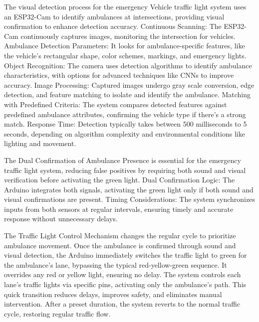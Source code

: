 \documentclass[conference]{IEEEtran}
\begin{document}
The visual detection process for the emergency Vehicle traffic light system uses an ESP32-Cam to identify ambulances at intersections, providing visual confirmation to enhance detection accuracy.
Continuous Scanning: The ESP32-Cam continuously captures images, monitoring the intersection for vehicles.
Ambulance Detection Parameters: It looks for ambulance-specific features, like the vehicle’s rectangular shape, color schemes, markings, and emergency lights.
Object Recognition: The camera uses detection algorithms to identify ambulance characteristics, with options for advanced techniques like CNNs to improve accuracy.
Image Processing: Captured images undergo gray scale conversion, edge detection, and feature matching to isolate and identify the ambulance.
Matching with Predefined Criteria: The system compares detected features against predefined ambulance attributes, confirming the vehicle type if there's a strong match.
Response Time: Detection typically takes between 500 milliseconds to 5 seconds, depending on algorithm complexity and environmental conditions like lighting and movement.


The Dual Confirmation of Ambulance Presence is essential for the emergency traffic light system, reducing false positives by requiring both sound and visual verification before activating the green light.
Dual Confirmation Logic: The Arduino integrates both signals, activating the green light only if both sound and visual confirmations are present.
Timing Considerations: The system synchronizes inputs from both sensors at regular intervals, ensuring timely and accurate response without unnecessary delays.

The Traffic Light Control Mechanism changes the regular cycle to prioritize ambulance movement. Once the ambulance is confirmed through sound and visual detection, the Arduino immediately switches the traffic light to green for the ambulance’s lane, bypassing the typical red-yellow-green sequence. It overrides any red or yellow light, ensuring no delay. The system controls each lane's traffic lights via specific pins, activating only the ambulance's path. This quick transition reduces delays, improves safety, and eliminates manual intervention. After a preset duration, the system reverts to the normal traffic cycle, restoring regular traffic flow.
\end{document}
